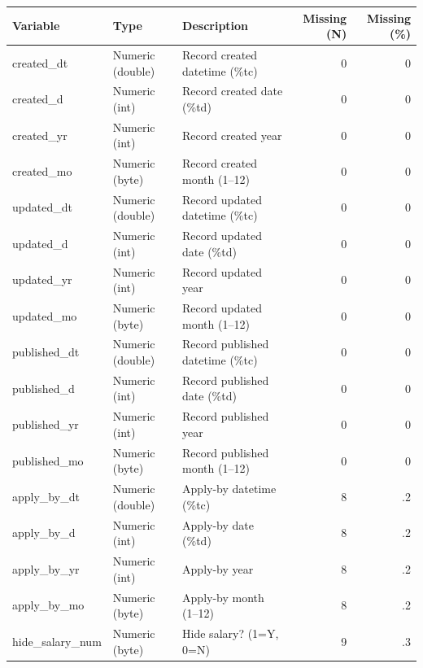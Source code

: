 \begin{threeparttable}


\begin{tabular}{@{}lllrr@{}}


\toprule


\textbf{Variable} & \textbf{Type} & \textbf{Description} & \textbf{Missing (N)} & \textbf{Missing (\%)} \\


\midrule


\midrule
created\_dt & Numeric (double) & Record created datetime (\%tc)&           0&           0\\
created\_d & Numeric (int) & Record created date (\%td)&           0&           0\\
created\_yr & Numeric (int) & Record created year&           0&           0\\
created\_mo & Numeric (byte) & Record created month (1–12)&           0&           0\\
updated\_dt & Numeric (double) & Record updated datetime (\%tc)&           0&           0\\
updated\_d & Numeric (int) & Record updated date (\%td)&           0&           0\\
updated\_yr & Numeric (int) & Record updated year&           0&           0\\
updated\_mo & Numeric (byte) & Record updated month (1–12)&           0&           0\\
published\_dt & Numeric (double) & Record published datetime (\%tc)&           0&           0\\
published\_d & Numeric (int) & Record published date (\%td)&           0&           0\\
published\_yr & Numeric (int) & Record published year&           0&           0\\
published\_mo & Numeric (byte) & Record published month (1–12)&           0&           0\\
apply\_by\_dt & Numeric (double) & Apply-by datetime (\%tc)&           8&          .2\\
apply\_by\_d & Numeric (int) & Apply-by date (\%td)&           8&          .2\\
apply\_by\_yr & Numeric (int) & Apply-by year&           8&          .2\\
apply\_by\_mo & Numeric (byte) & Apply-by month (1–12)&           8&          .2\\
hide\_salary\_num & Numeric (byte) & Hide salary? (1=Y, 0=N)&           9&          .3\\

\end{tabular}
\end{threeparttable}
